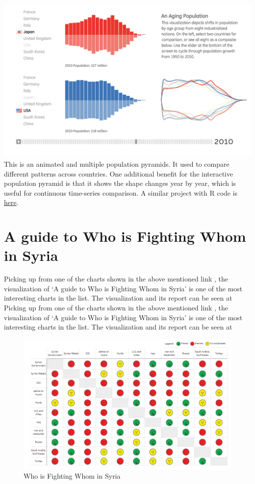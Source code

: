 \documentclass[]{book}
\theoremstyle{definition}
\theoremstyle{definition}
\theoremstyle{definition}
\theoremstyle{remark}
\begin{document}
\includegraphics{images/3_1.png} This is an animated and multiple
population pyramids. It used to compare different patterns across
countries. One additional benefit for the interactive population pyramid
is that it shows the shape changes year by year, which is useful for
continuous time-series comparison. A similar project with R code is
\href{https://www.r-bloggers.com/who-is-old-visualizing-the-concept-of-prospective-ageing-with-animated-population-pyramids/}{here}.

\section{A guide to Who is Fighting Whom in
Syria}\label{a-guide-to-who-is-fighting-whom-in-syria}

Picking up from one of the charts shown in the above mentioned link
\citep{int_viz_1}, the visualization of `A guide to Who is Fighting Whom
in Syria' is one of the most interesting charts in the list. The
visualization and its report can be seen at \citep{syria_chart} Picking
up from one of the charts shown in the above mentioned link
\citep{int_viz_1}, the visualization of `A guide to Who is Fighting Whom
in Syria' is one of the most interesting charts in the list. The
visualization and its report can be seen at

\begin{figure}
\centering
\includegraphics{images/img_syria_summary.PNG}
\caption{Who is Fighting Whom in Syria}
\end{figure}
\end{document}
